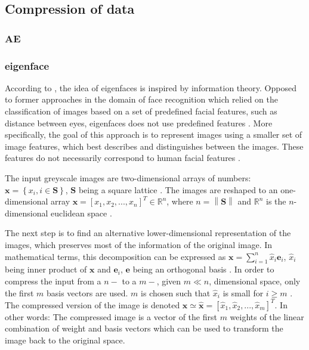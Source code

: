 \subsection{Compression of data}\label{subsec:compression}
\subsubsection{AE}\label{subsec:autoencoder}

\subsubsection{eigenface}\label{subsec:eigenface}

According to \citeauthor{eigenfaces1991}, the idea of eigenfaces is inspired by information theory.
Opposed to former approaches in the domain of face recognition which relied on the classification of images based on a set of predefined facial features, such as distance between eyes,
eigenfaces does not use predefined features \cite{eigenfaces1991}.
More specifically, the goal of this approach is to represent images using a smaller set of image features, which best describes and distinguishes between the images.
These features do not necessarily correspond to human facial features \cite{eigenfaces1991}.

The input greyscale images are two-dimensional arrays of numbers: $\textbf{x} = \left\{ x_i, i \in \textbf{S} \right\}$, $\textbf{S}$ being a square lattice \cite{eigenfaces1997}.
The images are reshaped to an one-dimensional array $\textbf{x} = \left[x_1, x_2, ..., x_n  \right]^{T} \in \mathbb{R}^{n}$, 
where $n = \left\| \textbf{S} \right\|$ and $\mathbb{R}^{n}$ is the $n$-dimensional euclidean space \cite{eigenfaces1997}.

The next step is to find an alternative lower-dimensional representation of the images, which preserves most of the information of the original image.
In mathematical terms, this decomposition can be expressed as 
$\textbf{x} = \sum_{i=1}^{n}\hat{x}_{i} \textbf{e}_{i}$, 
$\hat{x}_{i}$ being inner product of $\textbf{x}$ and $\textbf{e}_{i}$, 
$\textbf{e}$ being an orthogonal basis 
\cite{eigenfaces1997}.
In order to compress the input from a $n-$ to a $m-$, given $m \ll n$, dimensional space, only the first $m$ basis vectors are used.
$m$ is chosen such that $\hat{x}_{i}$ is small for $i \ge m$ \cite{eigenfaces1997}.
The compressed version of the image is denoted $\textbf{x} \simeq \hat{\textbf{x}} = \left[\hat{x}_{1}, \hat{x}_{2}, ..., \hat{x}_{m}  \right]^{T}$.
In other words: 
The compressed image is a vector of the first $m$ weights of the linear combination of weight and basis vectors which can be used to transform the image back to the original space.

